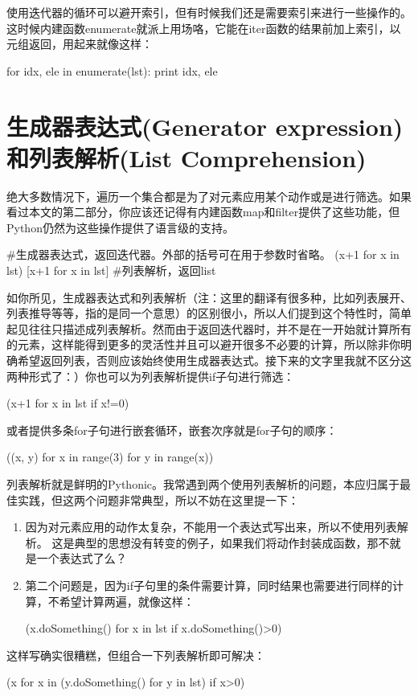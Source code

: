 \documentclass[12pt,a4paper]{report}
\begin{document}
使用迭代器的循环可以避开索引，但有时候我们还是需要索引来进行一些操作的。这时候内建函数enumerate就派上用场咯，它能在iter函数的结果前加上索引，以元组返回，用起来就像这样：
\begin{python}[moreemph={[4]42},caption={},label=ex1]
for idx, ele in enumerate(lst):
    print idx, ele
\end{python}

\section{生成器表达式(Generator expression)和列表解析(List Comprehension)} 
绝大多数情况下，遍历一个集合都是为了对元素应用某个动作或是进行筛选。如果看过本文的第二部分，你应该还记得有内建函数map和filter提供了这些功能，但Python仍然为这些操作提供了语言级的支持。
\begin{python}[moreemph={[4]42},caption={},label=ex1]
#生成器表达式，返回迭代器。外部的括号可在用于参数时省略。
(x+1 for x in lst)
[x+1 for x in lst] #列表解析，返回list
\end{python}

如你所见，生成器表达式和列表解析（注：这里的翻译有很多种，比如列表展开、列表推导等等，指的是同一个意思）的区别很小，所以人们提到这个特性时，简单起见往往只描述成列表解析。然而由于返回迭代器时，并不是在一开始就计算所有的元素，这样能得到更多的灵活性并且可以避开很多不必要的计算，所以除非你明确希望返回列表，否则应该始终使用生成器表达式。接下来的文字里我就不区分这两种形式了：）你也可以为列表解析提供if子句进行筛选：
\begin{python}[moreemph={[4]42},caption={},label=ex1]
(x+1 for x in lst if x!=0)
\end{python}

或者提供多条for子句进行嵌套循环，嵌套次序就是for子句的顺序：
\begin{python}[moreemph={[4]42},caption={},label=ex1]
((x, y) for x in range(3) for y in range(x))
\end{python}

列表解析就是鲜明的Pythonic。我常遇到两个使用列表解析的问题，本应归属于最佳实践，但这两个问题非常典型，所以不妨在这里提一下：
\begin{enumerate}
    \item 因为对元素应用的动作太复杂，不能用一个表达式写出来，所以不使用列表解析。 这是典型的思想没有转变的例子，如果我们将动作封装成函数，那不就是一个表达式了么？ 
    \item 第二个问题是，因为if子句里的条件需要计算，同时结果也需要进行同样的计算，不希望计算两遍，就像这样：
        \begin{python}[moreemph={[4]42},caption={},label=ex1]
(x.doSomething() for x in lst if x.doSomething()>0)
        \end{python}
\end{enumerate}
这样写确实很糟糕，但组合一下列表解析即可解决：
        \begin{python}[moreemph={[4]42},caption={},label=ex1]
(x for x in (y.doSomething() for y in lst) if x>0)
        \end{python}
\end{document}
